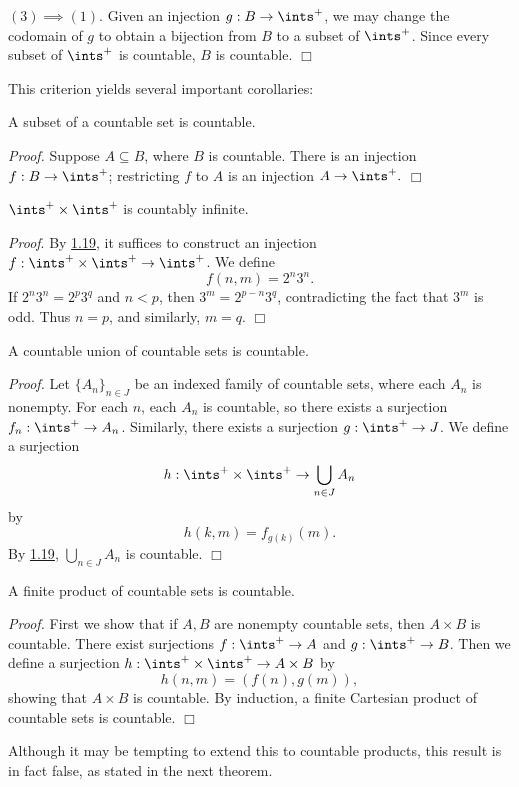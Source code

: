 $(3) \implies (1)$. Given an injection $g: B \rightarrow \ints^+$, we may change the codomain of $g$ to obtain a bijection from $B$ to a subset of $\ints^+$. Since every subset of $\ints^+$ is countable, $B$ is countable. $\Box$

This criterion yields several important corollaries:
\begin{corollary}\label{1.20}
    A subset of a countable set is countable.
\end{corollary}

{\it Proof.} Suppose $A \subseteq B$, where $B$ is countable. There is an injection $f: B \rightarrow \ints^+$; restricting $f$ to $A$ is an injection $A \rightarrow \ints^+.$ $\Box$

\begin{corollary}\label{1.21}
    $\ints^+ \times \ints^+$ is countably infinite.
\end{corollary}
{\it Proof}. By \hyperref[1.19]{1.19}, it suffices to construct an injection $f: \ints^+ \times \ints^+ \rightarrow \ints^+$. We define
$$f(n, m) = 2^n3^n.$$
If $2^n 3^n = 2^p 3^q$ and $n < p$, then $3^m = 2^{p-n}3^q$, contradicting the fact that $3^m$ is odd. Thus $n = p$, and similarly, $m = q$. $\Box$

\begin{theorem}\label{1.22}
    A countable union of countable sets is countable.
\end{theorem}
{\it Proof.} Let $\{A_n\}_{n \in J}$ be an indexed family of countable sets, where each $A_n$ is nonempty. For each $n$, each $A_n$ is countable, so there exists a surjection $f_n: \ints^+ \rightarrow A_n$. Similarly, there exists a surjection $g: \ints^+ \rightarrow J$. We define a surjection
$$h: \ints^+ \times \ints^+ \rightarrow \bigcup_{n \in J} A_n$$
by
$$h(k, m) = f_{g(k)}(m).$$
By \hyperref[1.19]{1.19}, $\bigcup_{n \in J} A_n$ is countable. $\Box$

\begin{theorem}\label{1.23}
    A finite product of countable sets is countable.
\end{theorem}
{\it Proof.} First we show that if $A, B$ are nonempty countable sets, then $A \times B$ is countable. There exist surjections $f: \ints^+ \rightarrow A$ and $g: \ints^+ \rightarrow B$. Then we define a surjection $h: \ints^+ \times \ints^+ \rightarrow A \times B$ by
$$h(n, m) = (f(n), g(m)),$$
showing that $A \times B$ is countable. By induction, a finite Cartesian product of countable sets is countable. $\Box$

Although it may be tempting to extend this to countable products, this result is in fact false, as stated in the next theorem.

